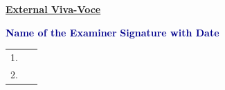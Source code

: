 \vspace{0.25cm}

\begin{center}
\textcolor{VTURed}{\underline{\textbf{External Viva-Voce}}}
\end{center}

\vspace{0.15cm}

\noindent
\textcolor{DarkBlue}{\textbf{Name of the Examiner}}
\hfill
\textcolor{DarkBlue}{\textbf{Signature with Date}}

\vspace{0.35cm}

\begin{tabular}{p{10cm}p{5cm}}

1.\ \dotfill & \dotfill \\[0.5cm]

2.\ \dotfill & \dotfill \\

\end{tabular}